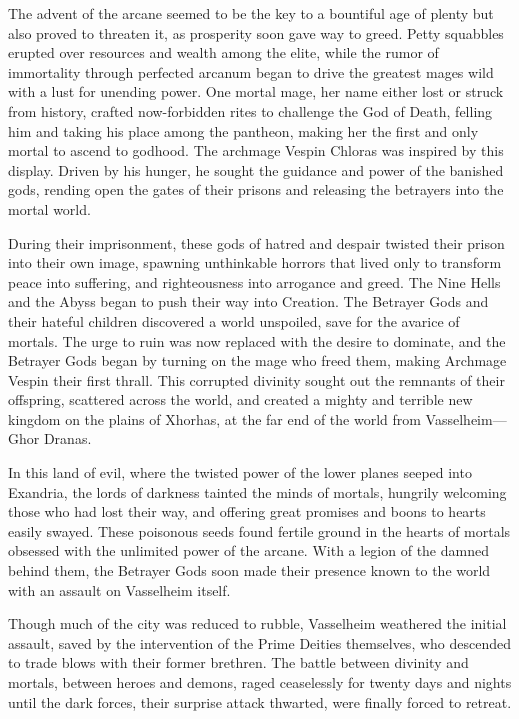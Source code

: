 \documentclass[10pt,a4paper,twoside,bg=print,twocolumn,openany,nodeprecatedcode]{dndbook}
\begin{document}
The advent of the arcane seemed to be the key to a bountiful age of plenty but also proved to threaten it, as prosperity soon gave way to greed. Petty squabbles erupted over resources and wealth among the elite, while the rumor of immortality through perfected arcanum began to drive the greatest mages wild with a lust for unending power. One mortal mage, her name either lost or struck from history, crafted now-forbidden rites to challenge the God of Death, felling him and taking his place among the pantheon, making her the first and only mortal to ascend to godhood. The archmage Vespin Chloras was inspired by this display. Driven by his hunger, he sought the guidance and power of the banished gods, rending open the gates of their prisons and releasing the betrayers into the mortal world.

During their imprisonment, these gods of hatred and despair twisted their prison into their own image, spawning unthinkable horrors that lived only to transform peace into suffering, and righteousness into arrogance and greed. The Nine Hells and the Abyss began to push their way into Creation. The Betrayer Gods and their hateful children discovered a world unspoiled, save for the avarice of mortals. The urge to ruin was now replaced with the desire to dominate, and the Betrayer Gods began by turning on the mage who freed them, making Archmage Vespin their first thrall. This corrupted divinity sought out the remnants of their offspring, scattered across the world, and created a mighty and terrible new kingdom on the plains of Xhorhas, at the far end of the world from Vasselheim—Ghor Dranas.

In this land of evil, where the twisted power of the lower planes seeped into Exandria, the lords of darkness tainted the minds of mortals, hungrily welcoming those who had lost their way, and offering great promises and boons to hearts easily swayed. These poisonous seeds found fertile ground in the hearts of mortals obsessed with the unlimited power of the arcane. With a legion of the damned behind them, the Betrayer Gods soon made their presence known to the world with an assault on Vasselheim itself.

Though much of the city was reduced to rubble, Vasselheim weathered the initial assault, saved by the intervention of the Prime Deities themselves, who descended to trade blows with their former brethren. The battle between divinity and mortals, between heroes and demons, raged ceaselessly for twenty days and nights until the dark forces, their surprise attack thwarted, were finally forced to retreat.
\end{document}

